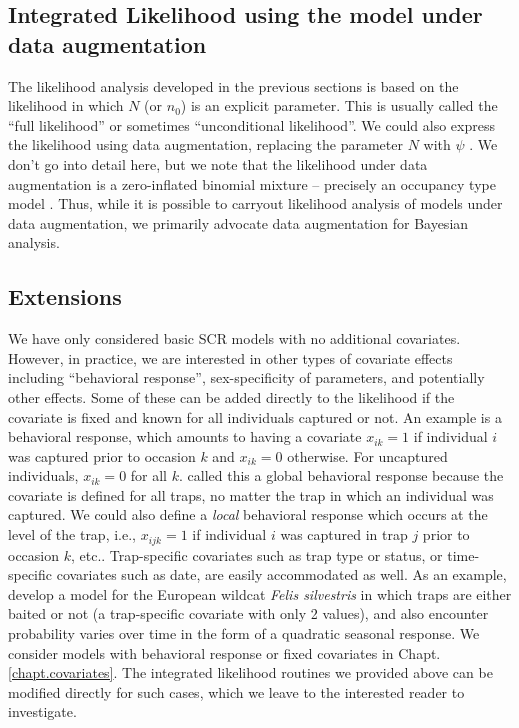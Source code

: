 \subsection{Integrated Likelihood using the model under data augmentation } 
\label{mle.sec.intlikDA}

The likelihood analysis developed in the previous sections
is based on the likelihood
in which $N$ (or $n_{0}$) is an explicit parameter. This is usually called
the ``full likelihood'' or sometimes ``unconditional likelihood''.  
We could also
express the  likelihood using data augmentation, replacing the
parameter $N$ with $\psi$ \citep[e.g., see Sec. 7.1.6][for an example]{royle_dorazio:2008}.
We don't go into detail here, but we note that the
likelihood under data augmentation is a zero-inflated binomial
mixture -- precisely an occupancy type model \citep{royle:2006}.
Thus, while it is possible to carryout likelihood analysis of
models under data augmentation, we primarily advocate data
augmentation for Bayesian analysis.


\subsection{ Extensions}

We have only considered basic SCR models with no additional
covariates. However, in practice, we are interested in other types of
covariate effects including ``behavioral response'', 
sex-specificity of parameters, and potentially other effects. Some of
these  can be added directly to the likelihood if the covariate is fixed
and known for all individuals captured or not. An example is a
behavioral response, which amounts to having a covariate $x_{ik}=1$ if
individual $i$ was captured prior to occasion $k$ and $x_{ik}=0$
otherwise. For uncaptured individuals, $x_{ik}=0$ for all $k$.
 \citet{royle_etal:2011jwm} called this a global behavioral
response because the covariate is defined for all traps, no matter the
trap in which an individual was captured. We could also define a {\it
  local} behavioral response which occurs at the level of the trap,
i.e., $x_{ijk}=1$ if individual $i$ was captured in trap $j$ prior to
occasion $k$, etc.. 
Trap-specific covariates such as trap type or status, or
time-specific covariates such as date, are easily accommodated as
well. As an example, \citet{kery_etal:2010} develop a model for the
European wildcat \emph{Felis silvestris}  in which traps are either baited or not (a
trap-specific covariate with only 2 values), and also encounter
probability varies over time in the form of a quadratic seasonal response.
We consider models with behavioral response or fixed covariates in
Chapt. \ref{chapt.covariates}.
The integrated likelihood routines we provided above can be
modified directly for such cases, which we leave to the interested
reader to investigate. 

